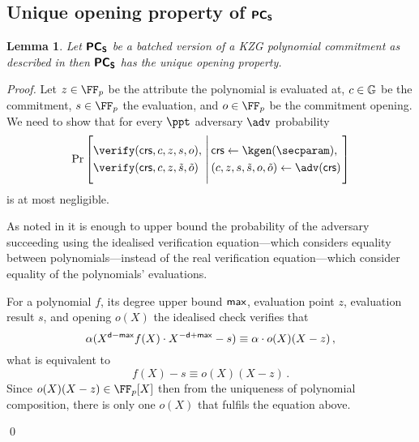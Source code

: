 \let\accentvec\vec \documentclass[runningheads]{llncs}
\newtheorem{lemma}[theorem]{Lemma}
\begin{document}
\subsection{Unique opening property of $\bm{\mathsf{PC}}_{\bm{\mathsf{S}}}$}
\begin{lemma}
\label{lem:pcoms_unique_op}
Let $\bm{\mathsf{PC}}_{\bm{\mathsf{S}}}$ be a batched version of a KZG polynomial commitment
\cite{AC:KatZavGol10} as described in \cite{CCS:MBKM19} then $\bm{\mathsf{PC}}_{\bm{\mathsf{S}}}$ has the unique opening property. 
\end{lemma}
\begin{proof}
Let 
$z \in \FF_p$ be the attribute the polynomial is evaluated at,
$c \in \mathbb{G}$ be the commitment,  
$s \in \FF_p$ the evaluation, and 
$o \in \FF_p$ be the commitment opening. 
We need to show that for every $\ppt$ adversary $\adv$ probability
\[
	\Pr
		\left[
			\begin{aligned}
				& \verify(\crs, c, z, s, o), \\
				& \verify(\crs, c, z, \tilde{s}, \tilde{o})
			\end{aligned}
		\,\left|\,
		\vphantom{\begin{aligned}
			& \verify(\crs, c, z, s, o),\\
			& \verify(\crs, c, z, \tilde{s}, \tilde{o}) \\
			&o \neq \tilde{o})
		\end{aligned}}
		\begin{aligned}
			& \crs \gets \kgen(\secparam), \\
			&	(c, z, s, \tilde{s}, o, \tilde{o}) \gets \adv(\crs)
		\end{aligned}
		\right.\right]
\]
is at most negligible.

As noted in \cite[Lemma 2.2]{EPRINT:GabWilCio19} it is enough to upper bound
the probability of the adversary succeeding using the idealised verification equation---which considers equality between polynomials---instead of the real verification equation---which consider equality of the polynomials' evaluations.

For a polynomial $f$, its degree upper bound $\mathsf{max}$, evaluation point $z$, evaluation result $s$, and opening $o(X)$ the idealised check verifies that
\begin{equation}
	\alpha (X^{\mathsf{d} - \mathsf{max}}f(X) \cdot X^{-\mathsf{d} + \mathsf{max}} -  s) \equiv \alpha \cdot o(X) (X - z)\,,
\end{equation}
what is equivalent to 
\begin{equation}
	f(X) -  s \equiv o(X) (X - z)\,.
	\label{eq:pcoms_idealised_check}
\end{equation}
Since $o(X)(X - z) \in \FF_p[X]$ then from the uniqueness of polynomial composition, there is only one $o(X)$ that fulfils the equation above.

\qed
\end{proof}
\end{document}
